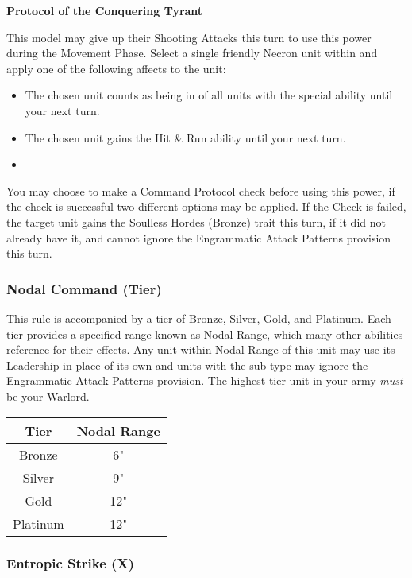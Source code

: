 \begin{multicols}{2}
\textbf{Protocol of the Conquering Tyrant}

This model may give up their Shooting Attacks this turn to use this power during the Movement Phase. Select a single friendly Necron unit within  and apply one of the following affects to the unit:

\begin{itemize}
	\itemsep 0pt
	\item The chosen unit counts as being in  of all units with the  special ability until your next turn.
	\item The chosen unit gains the Hit \& Run ability until your next turn.
	\item 
\end{itemize}

You may choose to make a Command Protocol check before using this power, if the check is successful two different options may be applied. If the Check is failed, the target unit gains the Soulless Hordes (Bronze) trait this turn, if it did not already have it, and cannot ignore the Engrammatic Attack Patterns provision this turn.

\subsubsection{Nodal Command (Tier)} \label{Nodal Command}

This rule is accompanied by a tier of Bronze, Silver, Gold, and Platinum. Each tier provides a specified range known as Nodal Range, which many other abilities reference for their effects. Any unit within Nodal Range of this unit may use its Leadership in place of its own and units with the  sub-type may ignore the Engrammatic Attack Patterns provision. The highest tier unit in your army \textit{must} be your Warlord.

\label{Nodal Range}
\begin{tabular}{|c|c|}
	\hline
	Tier & Nodal Range \\
	\hline
	Bronze & 6" \\
	Silver & 9" \\
	Gold & 12" \\
	Platinum & 12" \\
	\hline
\end{tabular}


\subsubsection{Entropic Strike (X)} \label{Entropic Strike}


\end{multicols}
